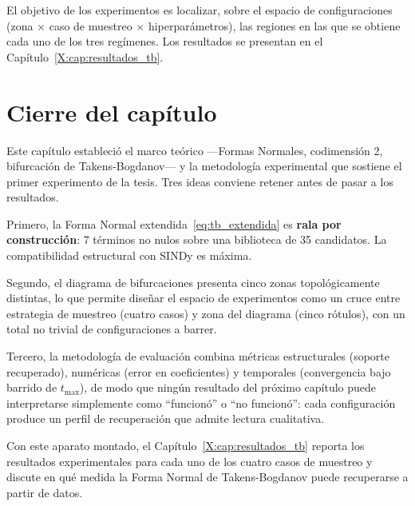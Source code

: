 El objetivo de los experimentos es localizar, sobre el espacio de configuraciones (zona $\times$ caso de muestreo $\times$ hiperparámetros), las regiones en las que se obtiene cada uno de los tres regímenes. Los resultados se presentan en el Capítulo~\ref{X:cap:resultados_tb}.

\section{Cierre del capítulo}

Este capítulo estableció el marco teórico —Formas Normales, codimensión 2, bifurcación de Takens-Bogdanov— y la metodología experimental que sostiene el primer experimento de la tesis. Tres ideas conviene retener antes de pasar a los resultados.

Primero, la Forma Normal extendida~\eqref{eq:tb_extendida} es \textbf{rala por construcción}: 7 términos no nulos sobre una biblioteca de 35 candidatos. La compatibilidad estructural con SINDy es máxima.

Segundo, el diagrama de bifurcaciones presenta cinco zonas topológicamente distintas, lo que permite diseñar el espacio de experimentos como un cruce entre estrategia de muestreo (cuatro casos) y zona del diagrama (cinco rótulos), con un total no trivial de configuraciones a barrer.

Tercero, la metodología de evaluación combina métricas estructurales (soporte recuperado), numéricas (error en coeficientes) y temporales (convergencia bajo barrido de $t_{\max}$), de modo que ningún resultado del próximo capítulo puede interpretarse simplemente como \enquote{funcionó} o \enquote{no funcionó}: cada configuración produce un perfil de recuperación que admite lectura cualitativa.

Con este aparato montado, el Capítulo~\ref{X:cap:resultados_tb} reporta los resultados experimentales para cada uno de los cuatro casos de muestreo y discute en qué medida la Forma Normal de Takens-Bogdanov puede recuperarse a partir de datos.

\clearpage
